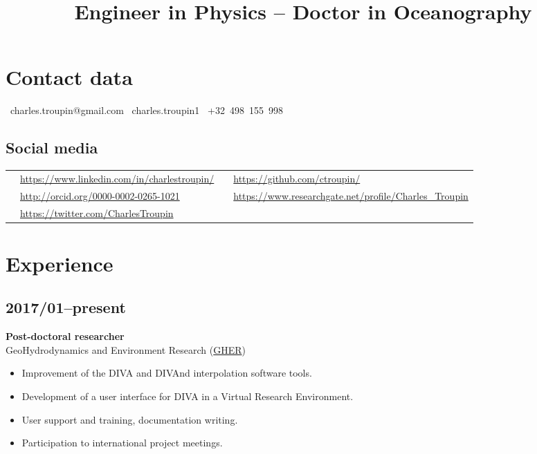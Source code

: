 \documentclass[11pt,a4paper,sans,svgnames]{moderncv}
\title{Engineer in Physics -- Doctor in Oceanography}               %
\begin{document}
\makecvtitle


\section{Contact data}

\faEnvelope~charles.troupin@gmail.com 	\hspace{1cm} \faSkype~charles.troupin1 \hspace{1cm} \faMobile~+32~498~155~998

\subsection{Social media}

\begin{tabular}{L{.03\textwidth}L{.42\textwidth}L{.03\textwidth}L{.5\textwidth}}
\faLinkedinSquare 	& \url{https://www.linkedin.com/in/charlestroupin/}		& \faGithubSquare	& \url{https://github.com/ctroupin/} \\
\aiOrcidSquare 		& \url{http://orcid.org/0000-0002-0265-1021} 	& \aiResearchGateSquare &\url{https://www.researchgate.net/profile/Charles_Troupin}\\
\faTwitterSquare	& \url{https://twitter.com/CharlesTroupin}		&  	& \\
\end{tabular}

\section{Experience}

\subsection{2017/01--present}
\textbf{Post-doctoral researcher}\\
GeoHydrodynamics and Environment Research (\href{http://modb.oce.ulg.ac.be/}{GHER})
\begin{itemize}%
\item Improvement of the DIVA and DIVAnd interpolation software tools.
\item Development of a user interface for DIVA in a Virtual Research Environment.
\item User support and training, documentation writing.
\item Participation to international project meetings.
\end{itemize}
\end{document}

